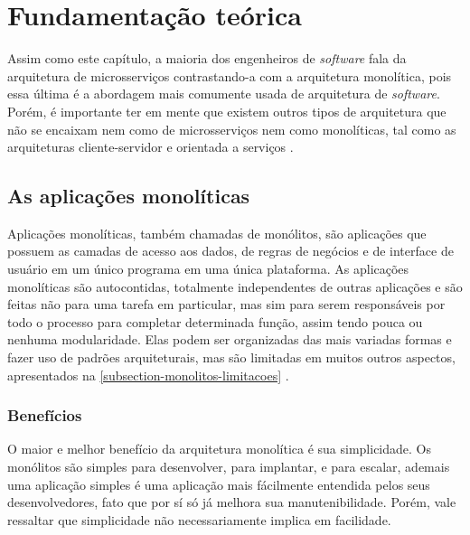 \chapter{Fundamentação teórica}\label{chapter-fundamentacao}



Assim como este capítulo, a maioria dos engenheiros de \emph{software} fala da arquitetura de microsserviços contrastando-a com a arquitetura monolítica, pois essa última é a abordagem mais comumente usada de arquitetura de \emph{software}. Porém, é importante ter em mente que existem outros tipos de arquitetura que não se encaixam nem como de microsserviços nem como monolíticas, tal como as arquiteturas cliente-servidor e orientada a serviços \cite{martin-fowler-microservice-tradeoffs}.

\section{As aplicações monolíticas}\label{sessao-monolitos}

Aplicações monolíticas, também chamadas de monólitos, são aplicações que possuem as camadas de acesso aos dados, de regras de negócios e de interface de usuário em um único programa em uma única plataforma. As aplicações monolíticas são autocontidas, totalmente independentes de outras aplicações e são feitas não para uma tarefa em particular, mas sim para serem responsáveis por todo o processo para completar determinada função, assim tendo pouca ou nenhuma modularidade. Elas podem ser organizadas das mais variadas formas e fazer uso de padrões arquiteturais, mas são limitadas em muitos outros aspectos, apresentados na \autoref{subsection-monolitos-limitacoes} \cite{wiki_monolithic_2022}.

\subsection{Benefícios}

O maior e melhor benefício da arquitetura monolítica é sua simplicidade. Os monólitos são simples para desenvolver, para implantar, e para escalar, ademais uma aplicação simples é uma aplicação mais fácilmente entendida pelos seus desenvolvedores, fato que por sí só já melhora sua manutenibilidade. Porém, vale ressaltar que simplicidade não necessariamente implica em facilidade.

